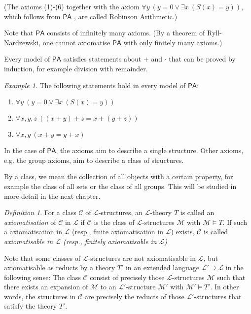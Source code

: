 \documentclass[a4paper, 11pt]{amsart}
\theoremstyle{remark}
\newtheorem{definition}[definition]{Definition}
\newtheorem{example}[example]{Example}
\newcommand{\axiomft}[1]{\mathsf{#1}}
\newcommand{\PA}{\axiomft{PA}}
\newcommand{\cL}{\mathcal L}
\newcommand{\cM}{\mathcal M}
\newcommand{\cC}{\mathcal C}
\begin{document}
(The axioms (1)-(6) together with the axiom $\forall y\ (y=0 \vee \exists x\ (S(x)=y))$, which follows from $\PA$ , are called Robinson Arithmetic.) 

Note that $\PA$ consists of infinitely many axioms. 
(By a theorem of Ryll-Nardzewski, one cannot axiomatise $\PA$ with only finitely many axioms.) 

Every model of $\PA$ satisfies statements about $+$ and $\cdot$ that can be proved by induction, for example division with remainder. 

\begin{example} 
The following statements hold in every model of $\PA$: 
\begin{enumerate} 
\item 
$\forall y\ (y=0 \vee \exists x\ (S(x)=y))$
\item 
$\forall x,y,z\ ((x+y)+z = x+(y+z))$ 
\item 
$\forall x,y\ (x+y = y+x)$ 
\end{enumerate} 
\end{example} 



In the case of $\PA$, the axioms aim to describe a single structure. 
Other axioms, e.g. the group axioms, aim to describe a class of structures. 

By a class, we mean the collection of all objects with a certain property, for example the class of all sets or the class of all groups. 
This will be studied in more detail in the next chapter. 

\begin{definition} 
For a class $\cC$ of $\cL$-structures, an $\cL$-theory $T$ is called an \emph{axiomatisation} of $\cC$ in $\cL$ if $\cC$ is the class of $\cL$-structures $\cM$ with $\cM \models T$. 
If such a axiomatisation in $\cL$ (resp., finite axiomatisation in $\cL$) exists, $\cC$ is called \emph{axiomatisable in $\cL$ (resp., finitely axiomatisable in $\cL$)}
\end{definition} 

Note that some classes of $\cL$-structures are not axiomatisable in $\cL$, but axiomatisable as reducts by a theory $T'$ in an extended language $\cL'\supseteq \cL$ in the following sense: 
The class $\cC$ consist of precisely those $\cL$-structures $\cM$ such that there exists an expansion of $\cM$ to an $\cL'$-structure $\cM'$ with $\cM' \models T'$. 
In other words, the structures in $\cC$ are precisely the reducts of those $\cL'$-structures that satisfy the theory $T'$. 
\end{document}
